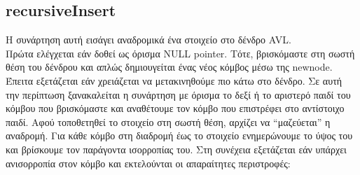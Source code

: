 \documentclass[12pt,a4paper]{article}
\begin{document}
    \subsection{recursiveInsert}
    Η συνάρτηση αυτή εισάγει αναδρομικά ένα στοιχείο στο δένδρο AVL.\\ Πρώτα ελέγχεται εάν δοθεί ως όρισμα NULL pointer. Τότε, βρισκόμαστε 
    στη σωστή θέση του δένδρου και απλώς δημιουγείται ένας νέος κόμβος μέσω της newnode. Έπειτα εξετάζεται εάν χρειάζεται να μετακινηθούμε πιο κάτω στο δένδρο. 
    Σε αυτή την περίπτωση ξανακαλείται η συνάρτηση με όρισμα το δεξί ή το αριστερό παιδί του κόμβου που βρισκόμαστε και αναθέτουμε τον κόμβο που επιστρέφει στο 
    αντίστοιχο παιδί. Αφού τοποθετηθεί το στοιχείο στη σωστή θέση, αρχίζει να ``μαζεύεται'' η αναδρομή. Για κάθε κόμβο στη διαδρομή έως το στοιχείο ενημερώνουμε  
    το ύψος του και βρίσκουμε τον παράγοντα ισορροπίας του. Στη συνέχεια εξετάζεται εάν υπάρχει ανισορροπία στον κόμβο και εκτελούνται οι απαραίτητες περιστροφές:
\end{document}

